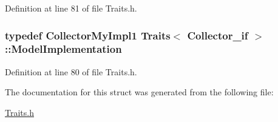 Definition at line 81 of file Traits.\-h.

\hypertarget{struct_traits_3_01_collector__if_01_4_a38ef8e0ef3488a361965174720a895ae}{
\subsubsection[{Model\-Implementation}]{\setlength{\rightskip}{0pt plus 5cm}typedef {\bf Collector\-My\-Impl1} {\bf Traits}$<$ {\bf Collector\-\_\-if} $>$\-::{\bf Model\-Implementation}}}\label{struct_traits_3_01_collector__if_01_4_a38ef8e0ef3488a361965174720a895ae}


Definition at line 80 of file Traits.\-h.



The documentation for this struct was generated from the following file\-:\begin{DoxyCompactItemize}
\item 
\hyperlink{_traits_8h}{Traits.\-h}\end{DoxyCompactItemize}
